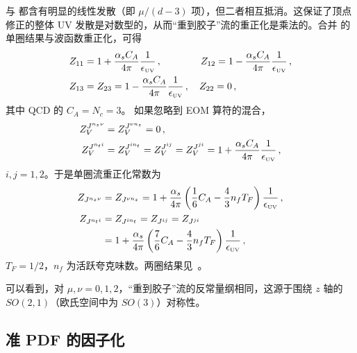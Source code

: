  与  都含有明显的线性发散（即 $\mu/(d-3)$ 项），但二者相互抵消。这保证了顶点修正的整体 UV 发散是对数型的，从而``重到胶子''流的重正化是乘法的。合并  的单圈结果与波函数重正化，可得
\begin{align}
	Z_{11} &= 1+ \frac{\alpha_s C_A}{4\pi}{1\over \epsilon_{\mbox{\tiny UV}}}\,,\qquad\qquad Z_{12} = 1- \frac{\alpha_s C_A}{4\pi}{1\over \epsilon_{\mbox{\tiny UV}}}\,,\nonumber\\
	Z_{13} &=Z_{23} = 1- \frac{\alpha_s C_A}{4\pi}{1\over \epsilon_{\mbox{\tiny UV}}}\,,\quad Z_{22} = 0\,,
\end{align}
其中 QCD 的 $C_A=N_c=3$。
如果忽略到 EOM 算符的混合，
\begin{align}
	Z^{J^{n_z\nu}}_V &= Z^{J^{\nu n_z}}_V = 0 \,,\nonumber\\
	Z^{J^{n_ti}}_V &= Z^{J^{in_t}}_V = Z^{J^{ij}}_V = Z^{J^{ji}}_V = 1+ \frac{\alpha_s C_A}{4\pi}  {1\over \epsilon_{\mbox{\tiny UV}}}\,,
\end{align}
$i,j=1,2$。于是单圈流重正化常数为
\begin{align}
	Z_{J^{n_z\nu}} &= Z_{J^{\nu n_z}} =1 +{\alpha_s\over 4\pi}\left({1\over 6}C_A - {4\over 3}n_fT_F\right) {1\over\epsilon_{\mbox{\tiny UV}}} \,,\nonumber\\
	Z_{J^{n_ti}} &= Z_{J^{in_t}} = Z_{J^{ij}} =Z_{J^{ji}} \nonumber\\
	&=1 + {\alpha_s\over 4\pi}\left({7\over 6}C_A - {4\over 3}n_fT_F\right) {1\over\epsilon_{\mbox{\tiny UV}}}\,,
\end{align}
$T_F=1/2$，$n_f$ 为活跃夸克味数。两圈结果见~\cite{Braun:2020ymy}。

可以看到，对 $\mu,\nu=0,1,2$，``重到胶子''流的反常量纲相同，这源于围绕 $z$ 轴的 $SO(2,1)$（欧氏空间中为 $SO(3)$）对称性。

\subsection{准 PDF 的因子化}
\label{sec:factorization}


